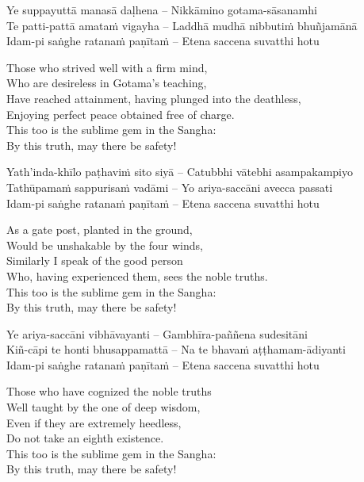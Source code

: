 Ye suppayuttā manasā daḷhena – Nikkāmino gotama-sāsanamhi\\
Te patti-pattā amataṁ vigayha – Laddhā mudhā nibbutiṁ bhuñjamānā\\
Idam-pi saṅghe ratanaṁ paṇītaṁ – Etena saccena suvatthi hotu

\begin{english-verses}
  Those who strived well with a firm mind,\\
  Who are desireless in Gotama's teaching,\\
  Have reached attainment, having plunged into the deathless,\\
  Enjoying perfect peace obtained free of charge.\\
  This too is the sublime gem in the Sangha:\\
  By this truth, may there be safety!
\end{english-verses}

Yath'inda-khīlo paṭhaviṁ sito siyā – Catubbhi vātebhi asampakampiyo\\
Tathūpamaṁ sappurisaṁ vadāmi – Yo ariya-saccāni avecca passati\\
Idam-pi saṅghe ratanaṁ paṇītaṁ – Etena saccena suvatthi hotu

\begin{english-verses}
  As a gate post, planted in the ground,\\
  Would be unshakable by the four winds,\\
  Similarly I speak of the good person\\
  Who, having experienced them, sees the noble truths.\\
  This too is the sublime gem in the Sangha:\\
  By this truth, may there be safety!
\end{english-verses}

Ye ariya-saccāni vibhāvayanti – Gambhīra-paññena sudesitāni\\
Kiñ-cāpi te honti bhusappamattā – Na te bhavaṁ aṭṭhamam-ādiyanti\\
Idam-pi saṅghe ratanaṁ paṇītaṁ – Etena saccena suvatthi hotu

\begin{english-verses}
  Those who have cognized the noble truths\\
  Well taught by the one of deep wisdom,\\
  Even if they are extremely heedless,\\
  Do not take an eighth existence.\\
  This too is the sublime gem in the Sangha:\\
  By this truth, may there be safety!
\end{english-verses}

